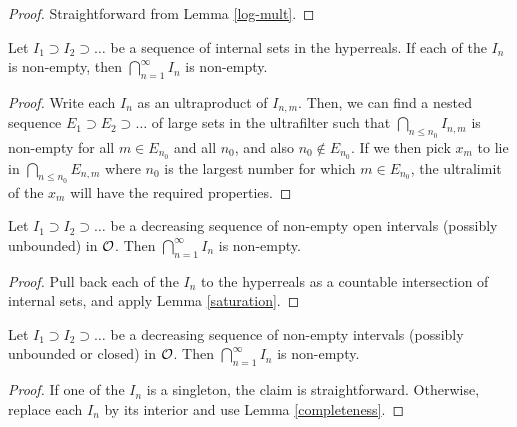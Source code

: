 \begin{proof} Straightforward from Lemma \ref{log-mult}.
\end{proof}

\begin{lemma}\label{saturation}\leanok Let $I_1 \supset I_2 \supset \dots$ be a sequence of internal sets in the hyperreals.  If each of the $I_n$ is non-empty, then $\bigcap_{n=1}^\infty I_n$ is non-empty.
\end{lemma}

\begin{proof}  Write each $I_n$ as an ultraproduct of $I_{n,m}$.  Then, we can find a nested sequence $E_1 \supset E_2 \supset \dots$ of large sets in the ultrafilter such that $\bigcap_{n \leq n_0} I_{n,m}$ is non-empty for all $m \in E_{n_0}$ and all $n_0$, and also $n_0 \not \in E_{n_0}$.  If we then pick $x_m$ to lie in $\bigcap_{n \leq n_0} E_{n,m}$ where $n_0$ is the largest number for which $m \in E_{n_0}$, the ultralimit of the $x_m$ will have the required properties.
\end{proof}

\begin{lemma}[Completeness]\label{completeness} Let $I_1 \supset I_2 \supset \dots$ be a decreasing sequence of non-empty open intervals (possibly unbounded) in ${\mathcal O}$.  Then $\bigcap_{n=1}^\infty I_n$ is non-empty.
\end{lemma}

\begin{proof} Pull back each of the $I_n$ to the hyperreals as a countable intersection of internal sets, and apply Lemma \ref{saturation}.
\end{proof}

\begin{lemma}[Completeness, II]\label{completeness-2} Let $I_1 \supset I_2 \supset \dots$ be a decreasing sequence of non-empty intervals (possibly unbounded or closed) in ${\mathcal O}$.  Then $\bigcap_{n=1}^\infty I_n$ is non-empty.
\end{lemma}

\begin{proof}   If one of the $I_n$ is a singleton, the claim is straightforward.  Otherwise, replace each $I_n$ by its interior and use Lemma \ref{completeness}.
\end{proof}


